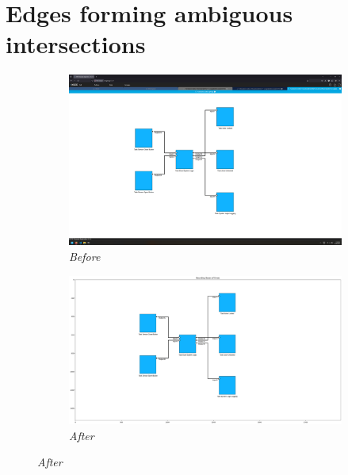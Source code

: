 \documentclass{article}
\begin{document}
\section{Edges forming ambiguous intersections}
\begin{figure}[H]
    \centering
    \begin{subfigure}[t]{0.9\textwidth}
        \centering
        \includegraphics[width=\textwidth]{testcases/edges_forming_bad_intersection/151929-204247_input_image.png}
        \caption*{\textit{Before}}
    \end{subfigure}
    \newline    
    \begin{subfigure}[t]{0.9\textwidth}
        \centering
        \includegraphics[width=\textwidth]{testcases/edges_forming_bad_intersection/151941-652255_element_bbox_errors_labeled_colored.png}
        \caption*{\textit{After}}
    \end{subfigure}
    \label{fig:edges_ambiguous_intersections}
\end{figure}
\newpage
\end{document}
